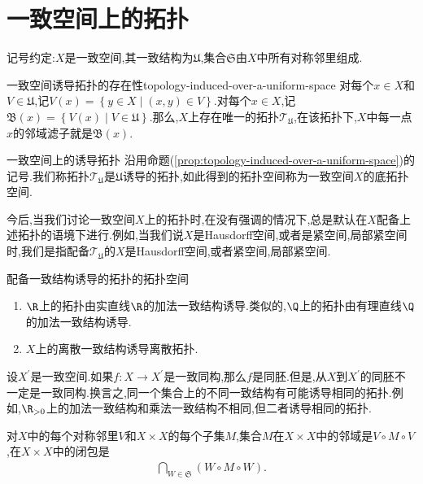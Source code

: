 \section{一致空间上的拓扑}

记号约定:$X$是一致空间,其一致结构为$\mathfrak{U}$,集合$\mathfrak{S}$由$X$中所有对称邻里组成.

\begin{proposition}{一致空间诱导拓扑的存在性}{topology-induced-over-a-uniform-space}
	对每个$x\in X$和$V\in\mathfrak{U}$,记$V\left(x\right)=\left\{y\in X\middle|\left(x,y\right)\in V\right\}$.对每个$x\in X$,记$\mathfrak{B}\left(x\right)=\left\{V\left(x\right)\middle|V\in\mathfrak{U}\right\}$.那么,$X$上存在唯一的拓扑$\mathcal{T}_{\mathfrak{U}}$,在该拓扑下,$X$中每一点$x$的邻域滤子就是$\mathfrak{B}\left(x\right)$.
\end{proposition}

\begin{definition}{一致空间上的诱导拓扑}{}
	沿用命题(\ref{prop:topology-induced-over-a-uniform-space})的记号.我们称拓扑$\mathcal{T}_{\mathfrak{U}}$是$\mathfrak{U}$诱导的拓扑,如此得到的拓扑空间称为一致空间$X$的底拓扑空间.
\end{definition}

\begin{remark}{}{}
	今后,当我们讨论一致空间$X$上的拓扑时,在没有强调的情况下,总是默认在$X$配备上述拓扑的语境下进行.例如,当我们说$X$是Hausdorff空间,或者是紧空间,局部紧空间时,我们是指配备$\mathcal{T}_{\mathfrak{U}}$的$X$是Hausdorff空间,或者紧空间,局部紧空间.
\end{remark}

\begin{example}{配备一致结构诱导的拓扑的拓扑空间}{}
	\begin{enumerate}
		\item $\R$上的拓扑由实直线$\R$的加法一致结构诱导.类似的,$\Q$上的拓扑由有理直线$\Q$的加法一致结构诱导.
		\item $X$上的离散一致结构诱导离散拓扑.
	\end{enumerate}
\end{example}

\begin{remark}{}{}
	设$X^{\prime}$是一致空间.如果$f:X\to X^{\prime}$是一致同构,那么$f$是同胚.但是,从$X$到$X^{\prime}$的同胚不一定是一致同构.换言之,同一个集合上的不同一致结构有可能诱导相同的拓扑.例如,$\R_{>0}$上的加法一致结构和乘法一致结构不相同,但二者诱导相同的拓扑.
\end{remark}

\begin{proposition}{}{}
	对$X$中的每个对称邻里$V$和$X\times X$的每个子集$M$,集合$M$在$X\times X$中的邻域是$V\circ M\circ V$,在$X\times X$中的闭包是
	\begin{align*}
		\bigcap\limits_{W\in\mathfrak{S}}\left(W\circ M\circ W\right).
	\end{align*}
\end{proposition}

